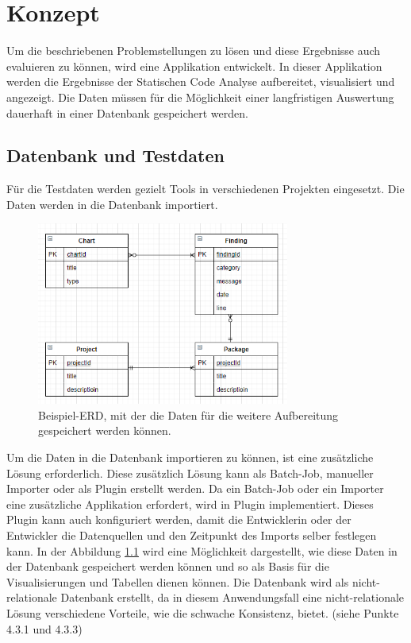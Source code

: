 \chapter{Konzept}
\label{chap:concept}
\chapterstart
Um die beschriebenen Problemstellungen zu lösen und diese Ergebnisse auch evaluieren zu können, wird eine Applikation entwickelt. In dieser Applikation werden die Ergebnisse der Statischen Code Analyse aufbereitet, visualisiert und angezeigt. Die Daten müssen für die Möglichkeit einer langfristigen Auswertung dauerhaft in einer Datenbank gespeichert werden. 
\section{Datenbank und Testdaten}
Für die Testdaten werden gezielt Tools in verschiedenen Projekten eingesetzt. Die Daten werden in die Datenbank importiert. 
\begin{figure}[tp]
  \centering
  \includegraphics[height=6cm]{images/chartERD.PNG}
 \caption[Beispiel-ERD, mit der die Daten für die weitere Aufbereitung gespeichert werden können.]{Beispiel-ERD, mit der die Daten für die weitere Aufbereitung gespeichert werden können.}
  \label{fig:chartERD}
\end{figure}
Um die Daten in die Datenbank importieren zu können, ist eine zusätzliche Lösung erforderlich. Diese zusätzlich Lösung kann als Batch-Job, manueller Importer oder als Plugin erstellt werden. Da ein Batch-Job oder ein Importer eine zusätzliche Applikation erfordert, wird in Plugin implementiert. Dieses Plugin kann auch konfiguriert werden, damit die Entwicklerin oder der Entwickler die Datenquellen und den Zeitpunkt des Imports selber festlegen kann. In der Abbildung \ref{fig:chartERD} wird eine Möglichkeit dargestellt, wie diese Daten in der Datenbank gespeichert werden können und so als Basis für die Visualisierungen und Tabellen dienen können. Die Datenbank wird als nicht-relationale Datenbank erstellt, da in diesem Anwendungsfall eine nicht-relationale Lösung verschiedene Vorteile, wie die schwache Konsistenz, bietet. (siehe Punkte 4.3.1 und 4.3.3)
